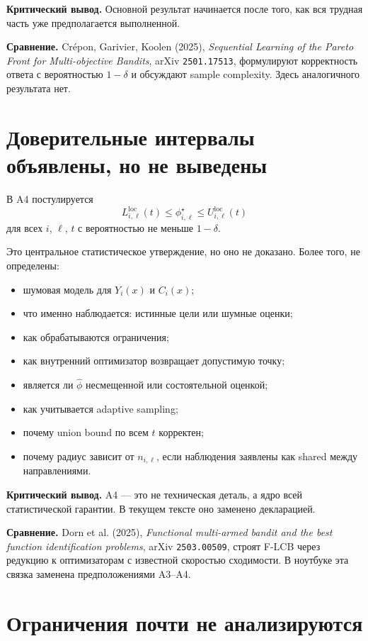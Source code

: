 \documentclass[11pt,a4paper]{article}
\begin{document}
\textbf{Критический вывод.} Основной результат начинается после того, как вся трудная часть уже предполагается выполненной.

\textbf{Сравнение.} Crépon, Garivier, Koolen (2025), \emph{Sequential Learning of the Pareto Front for Multi-objective Bandits}, arXiv \texttt{2501.17513}, формулируют корректность ответа с вероятностью $1-\delta$ и обсуждают sample complexity. Здесь аналогичного результата нет.

\section{Доверительные интервалы объявлены, но не выведены}

В A4 постулируется
\[
L_{i,\ell}^{\mathrm{loc}}(t) \le \phi_{i,\ell}^{\star} \le U_{i,\ell}^{\mathrm{loc}}(t)
\]
для всех $i$, $\ell$, $t$ с вероятностью не меньше $1-\delta$.

Это центральное статистическое утверждение, но оно не доказано. Более того, не определены:
\begin{itemize}
    \item шумовая модель для $Y_i(x)$ и $C_i(x)$;
    \item что именно наблюдается: истинные цели или шумные оценки;
    \item как обрабатываются ограничения;
    \item как внутренний оптимизатор возвращает допустимую точку;
    \item является ли $\hat\phi$ несмещенной или состоятельной оценкой;
    \item как учитывается adaptive sampling;
    \item почему union bound по всем $t$ корректен;
    \item почему радиус зависит от $n_{i,\ell}$, если наблюдения заявлены как shared между направлениями.
\end{itemize}

\textbf{Критический вывод.} A4 --- это не техническая деталь, а ядро всей статистической гарантии. В текущем тексте оно заменено декларацией.

\textbf{Сравнение.} Dorn et al. (2025), \emph{Functional multi-armed bandit and the best function identification problems}, arXiv \texttt{2503.00509}, строят F-LCB через редукцию к оптимизаторам с известной скоростью сходимости. В ноутбуке эта связка заменена предположениями A3--A4.

\section{Ограничения почти не анализируются}
\end{document}
